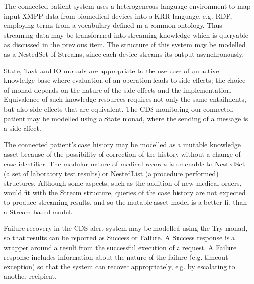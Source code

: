 \documentclass[runningheads]{llncs}
\begin{document}

The connected-patient system uses a heterogeneous language environment to map input XMPP data from biomedical devices into a KRR language, e.g. RDF, employing terms from a vocabulary defined in a common ontology. Thus streaming data may be transformed into streaming knowledge which is queryable as discussed in the previous item. The structure of this system may be modelled as a NestedSet of Streams, since each device streams its output asynchronously.

State, Task and IO monads are appropriate to the use case of an active knowledge base where evaluation of an operation leads to side-effects; the choice of monad depends on the nature of the side-effects and the implementation.
Equivalence of such knowledge resources requires not only the same entailments, but also side-effects that are  equivalent.
The CDS monitoring our connected patient may be modelled using a State monad, where the sending of a message is a side-effect.

The connected patient's case history may be modelled as a mutable knowledge asset  because of the possibility of correction of the history without a change of case identifier. The modular nature of medical records is amenable to NestedSet (a set of laboratory test results) or NestedList (a procedure performed) structures. Although some aspects, such as the addition of new medical orders, would fit with the Stream structure, queries of the case history are not expected to produce streaming results, and so the mutable asset model is a better fit than a Stream-based model.

Failure recovery in the CDS alert system may be modelled using the Try monad, so that results can be reported as Success or Failure. A Success response is a wrapper around a result from the successful execution of a request. A Failure response includes information about the nature of the failure (e.g. timeout exception) so that the system can recover appropriately, e.g. by escalating to another recipient.
\end{document}
